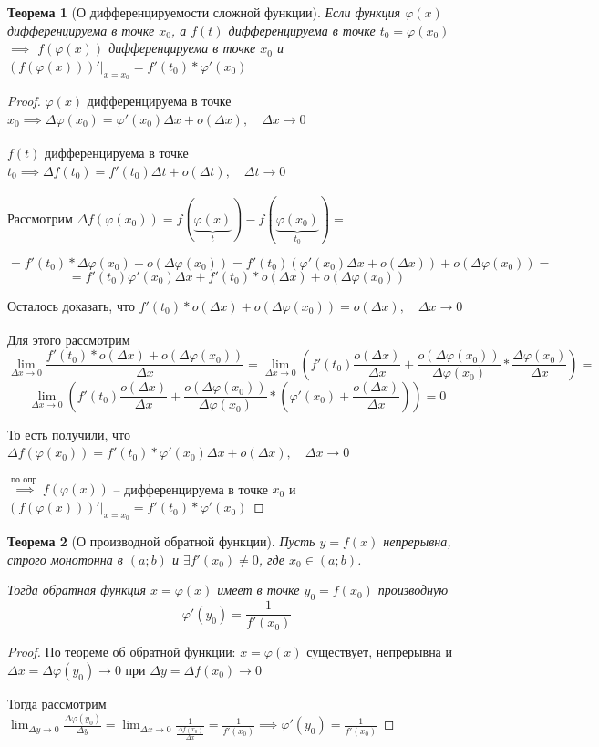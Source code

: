 \documentclass[a4paper,oneside]{article}
\newcommand{\bydef}{\stackrel{\text{по опр.}}{\implies}} %
\newcommand{\dslim}{\displaystyle\lim}
\newcommand{\approach}[1]{\underset{#1}{\longrightarrow}}
\newtheorem{theorem}{Теорема}[subsection]
\theoremstyle{definition}
\theoremstyle{definition}
\theoremstyle{definition}
\begin{document}
\begin{theorem}[О дифференцируемости сложной функции]
    Если функция $\varphi (x)$ дифференцируема в точке $x_0$, а $f(t)$ 
    дифференцируема в точке $t_0 = \varphi (x_0)$ $\implies$
    $f(\varphi (x))$ дифференцируема в точке $x_0$ и
    $(f(\varphi (x)))' |_{x = x_0} = f'(t_0) * \varphi' (x_0)$
\end{theorem}
\begin{proof}
    $\varphi (x)$ дифференцируема в точке $x_0 \implies \Delta \varphi (x_0) = \varphi' (x_0) \Delta x + o(\Delta x), \quad \Delta x \approach{} 0$

    $f(t)$ дифференцируема в точке $t_0 \implies \Delta f(t_0) = f'(t_0) \Delta t + o(\Delta t), \quad \Delta t \approach{} 0$

    Рассмотрим $\Delta f(\varphi (x_0)) = f(\underbrace{\varphi (x)}_t) - f(\underbrace{\varphi (x_0)}_{t_0}) =$

    \[ 
        = f'(t_0) * \Delta \varphi (x_0) + o(\Delta \varphi (x_0))
        = f'(t_0) (\varphi' (x_0) \Delta x + o(\Delta x)) + o(\Delta \varphi (x_0)) =
    \]
    \[ = f'(t_0) \varphi'(x_0) \Delta x + f'(t_0) * o(\Delta x) + o(\Delta \varphi (x_0)) \]

    Осталось доказать, что $f'(t_0) * o(\Delta x) + o(\Delta \varphi (x_0)) = o(\Delta x), \quad \Delta x \approach{} 0$

    Для этого рассмотрим 
    \[
        \dslim_{\Delta x \to 0} \frac{f'(t_0) * o(\Delta x) + o(\Delta \varphi (x_0))}{\Delta x} =
        \dslim_{\Delta x \to 0} \left( f'(t_0) \frac{o(\Delta x)}{\Delta x} + \frac{o(\Delta \varphi (x_0))}{\Delta \varphi (x_0)} * \frac{\Delta \varphi (x_0)}{\Delta x} \right) =
    \]
    \[ \dslim_{\Delta x \to 0} \left( f'(t_0) \frac{o(\Delta x)}{\Delta x} + \frac{o(\Delta \varphi (x_0))}{\Delta \varphi (x_0)} * \left( \varphi' (x_0) + \frac{o(\Delta x)}{\Delta x} \right) \right) = 0\]

    То есть получили, что $\Delta f(\varphi (x_0)) = f'(t_0) * \varphi' (x_0) \Delta x + o(\Delta x), \quad \Delta x \approach{} 0$

    $\bydef f(\varphi (x))$ -- дифференцируема в точке $x_0$ и $(f(\varphi (x)))' |_{x = x_0} = f'(t_0) * \varphi' (x_0)$

\end{proof}

\begin{theorem}[О производной обратной функции]
    Пусть $y = f(x)$ непрерывна, строго монотонна в $(a; b)$ и
    $\exists f'(x_0) \ne 0$, где $x_0 \in (a; b)$.

    Тогда обратная функция $x = \varphi (x)$ имеет в точке $y_0 = f(x_0)$ производную
    \[ \varphi' (y_0) = \frac{1}{f'(x_0)} \]
\end{theorem}
\begin{proof}
    По теореме об обратной функции: $x= \varphi (x)$ существует, непрерывна и
    $\Delta x = \Delta \varphi (y_0) \approach{} 0$ при $\Delta y = \Delta f(x_0) \approach{} 0$

    Тогда рассмотрим $\dslim_{\Delta y \to 0} \frac{\Delta \varphi (y_0)}{\Delta y} =
    \dslim_{\Delta x \to 0} \frac{1}{\frac{\Delta f(x_0)}{\Delta x}} = \frac{1}{f'(x_0)}
    \implies \varphi'(y_0) = \frac{1}{f'(x_0)}$
\end{proof}
\end{document}
